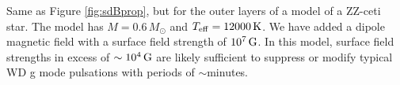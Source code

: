 \label{fig:WDProp}
Same as Figure \ref{fig:sdBprop}, but for the outer layers of a model of a ZZ-ceti star. The model has $M=0.6\,M_\odot$ and $T_{\rm eff} = 12000 \, {\rm K}$. We have added a dipole magnetic field with a surface field strength of $10^7 \, {\rm G}$. In this model, surface field strengths in excess of $\sim 10^4 \, {\rm G}$ are likely sufficient to suppress or modify typical WD g mode pulsations with periods of $\sim$minutes.